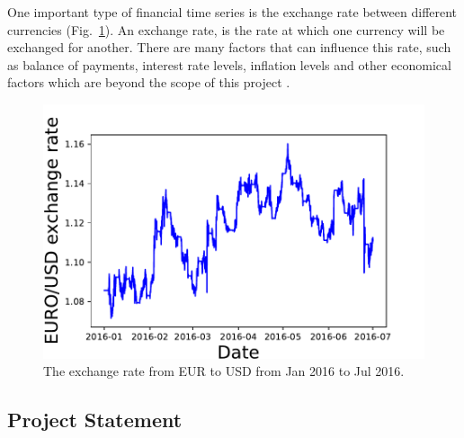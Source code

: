 \documentclass[10pt,a4paper]{article}
\begin{document}
One important type of financial time series is the exchange rate between different currencies (Fig.~\ref{fig:EURUSD example}). An exchange rate, is the rate at which one currency will be exchanged for another. There are many factors that can influence this rate, such as balance of payments, interest rate levels, inflation levels and other economical factors which are beyond the scope of this project \cite{Patel_2014}.


\begin{figure}[h]
\begin{center}
\includegraphics[scale=0.4]{EURO_USD_exchange_rate.pdf}
\caption{The exchange rate from EUR to USD from Jan 2016 to Jul 2016.}
\label{fig:EURUSD example}
\centering
\end{center}
\end{figure}


\subsection{Project Statement}
%
\end{document}
